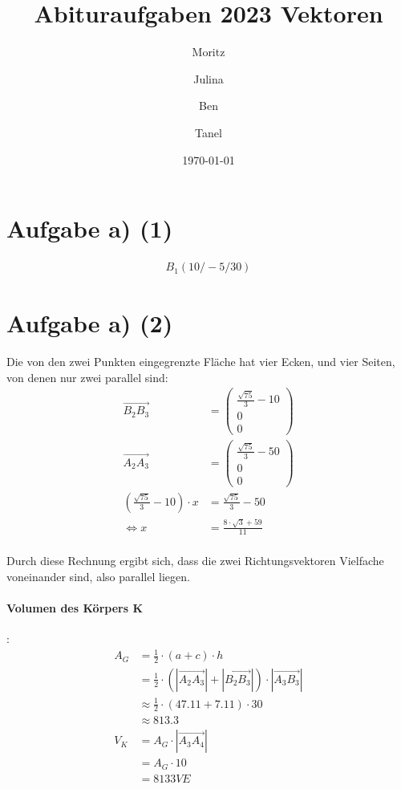 \documentclass[12pt,a4paper]{report}
\begin{document}
\title{Abituraufgaben 2023 Vektoren}
\author{Moritz \and Julina \and Ben \and Tanel}
\date{\today}
\maketitle

\section{Aufgabe a) (1)}
\begin{align*}
	B_1(10/-5/30)
\end{align*}
\section{Aufgabe a) (2)}
Die von den zwei Punkten eingegrenzte Fläche hat vier Ecken, und vier Seiten, von denen nur zwei parallel sind:
\begin{align*}
	\overrightarrow{B_2B_3} &= \begin{pmatrix}\frac{\sqrt{75}}{3} - 10 \\ 0 \\ 0\end{pmatrix} \\
	\overrightarrow{A_2A_3} &= \begin{pmatrix}\frac{\sqrt{75}}{3} - 50 \\ 0 \\ 0\end{pmatrix} \\
	(\frac{\sqrt{75}}{3}-10) \cdot x &= \frac{\sqrt{75}}{3} - 50 \\
	\Leftrightarrow x &= \frac{8\cdot\sqrt{3}+59}{11}
\end{align*}
\\
Durch diese Rechnung ergibt sich, dass die zwei Richtungsvektoren Vielfache voneinander sind, also parallel liegen.

\paragraph{Volumen des Körpers K}:
\begin{align*}
	A_G &= \frac{1}{2} \cdot (a+c) \cdot h \\
	&= \frac{1}{2} \cdot (|\overrightarrow{A_2A_3}| + |\overrightarrow{B_2B_3}|) \cdot |\overrightarrow{A_3B_3}| \\
	&\approx \frac{1}{2} \cdot (47.11 + 7.11) \cdot 30 \\
	&\approx 813.3 \\
	V_K &= A_G \cdot |\overrightarrow{A_3A_4}| \\
	&= A_G \cdot 10 \\
	&= 8133VE
\end{align*}
\end{document}

